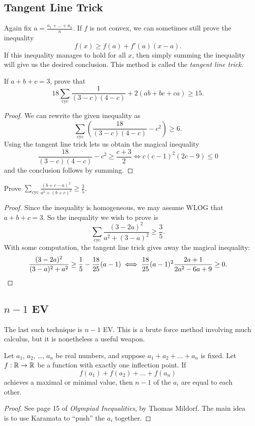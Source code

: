 \documentclass[11pt]{scrartcl}
\begin{document}
\subsection{Tangent Line Trick}
Again fix $a = \frac{a_1 + \dots + a_n}{n}$.
If $f$ is not convex, we can sometimes still prove the inequality
\[ f(x) \ge f(a) + f'(a) \left( x-a \right). \]
If this inequality manages to hold for all $x$,
then simply summing the inequality will give us the desired conclusion.
This method is called the \emph{tangent line trick}.

\begin{example}
	 If $a+b+c=3$, prove that \[ 18\sum_{\text{cyc}}\frac{1}{(3-c)(4-c)}+2(ab+bc+ca)\ge 15. \]
\end{example}
\begin{proof}
	We can rewrite the given inequality as
	\[ \sum_{\text{cyc}} \left( \frac{18}{(3-c)(4-c)} - c^2 \right) \ge 6. \]
	Using the tangent line trick lets us obtain the magical inequality
	\[ \frac{18}{(3-c)(4-c)} -c^2 \ge \frac{c+3}{2}\iff c(c-1)^2(2c-9)\le 0 \]
	and the conclusion follows by summing.
\end{proof}
\begin{example}
	[Japan] Prove $\sum_{\text{cyc}} \frac{(b+c-a)^2}{a^2+(b+c)^2} \ge \frac 35$.
\end{example}
\begin{proof}
	Since the inequality is homogeneous, we may assume WLOG that $a+b+c=3$.
	So the inequality we wish to prove is
	\[ \sum_{\text{cyc}} \frac{(3-2a)^2}{a^2+(3-a)^2} \ge \frac 35. \]
	With some computation, the tangent line trick gives away the magical inequality:
	\[  
		\frac{(3-2a)^{2}}{(3-a)^{2}+a^{2}}\ge\frac{1}{5} - \frac{18}{25}(a-1)
		\iff 
		\frac{18}{25}(a-1)^{2}\frac{2a+1}{2a^{2}-6a+9}
		\ge 0. \qedhere \]
\end{proof}

\subsection{$n-1$ EV}
The last such technique is $n-1$ EV.
This is a brute force method involving much calculus, but it is nonetheless a useful weapon.
\begin{theorem}
	[$n-1$ EV] Let $a_1$, $a_2$, \dots, $a_n$ be real numbers, and suppose $a_1 + a_2 + \dots + a_n$ is fixed.
	Let $f : \mathbb R \to \mathbb R$ be a function with exactly one inflection point.
	If
	\[ f(a_1) + f(a_2) + \dots + f(a_n) \]
	achieves a maximal or minimal value, then $n-1$ of the $a_i$ are equal to each other.
\end{theorem}
\begin{proof}
	See page 15 of \emph{Olympiad Inequalities}, by Thomas Mildorf.
	The main idea is to use Karamata to ``push'' the $a_i$ together.
\end{proof}
\end{document}
